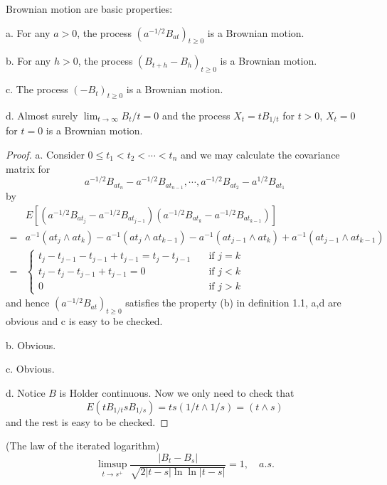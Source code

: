 \documentclass[lang=en, color=blue, ]{elegantbook}
\begin{document}
\begin{proposition}
    Brownian motion are basic properties:\par
    a. For any $a>0$, the process $(a^{-1/2}B_{at})_{t\geq 0}$ is a Brownian motion.\par
    b. For any $h>0$, the process $(B_{t+h}-B_h)_{t\geq 0}$ is a Brownian motion.\par
    c. The process $(-B_t)_{t\geq 0}$ is a Brownian motion.\par
    d. Almost surely $\lim_{t\to\infty} B_t/t = 0$ and the process $X_t = tB_{1/t}$ for $t>0$, $X_t = 0$ for $t=0$ is a Brownian motion.
\end{proposition}
\begin{proof}\par
    a. Consider $0\leq t_1<t_2<\cdots<t_n$ and we may calculate the covariance matrix for
    \[a^{-1/2}B_{at_n}-a^{-1/2}B_{at_{n-1}},\cdots,a^{-1/2}B_{at_2}-a^{1/2}B_{at_1}\]
    by
    \[
    \begin{aligned}
    &E[(a^{-1/2}B_{at_j}-a^{-1/2}B_{at_{j-1}})(a^{-1/2}B_{at_k}-a^{-1/2}B_{at_{k-1}})]\\ = &a^{-1}(at_j\wedge at_k)-a^{-1}(at_j\wedge at_{k-1})-a^{-1}(at_{j-1}\wedge at_k) + a^{-1}(at_{j-1}\wedge at_{k-1}) \\
    = &\begin{cases}
        t_j-t_{j-1}-t_{j-1}+t_{j-1} = t_j - t_{j-1}\quad&\text{if }j=k \\
        t_j-t_j - t_{j-1}+t_{j-1} = 0 &\text{if }j<k \\
        0&\text{if }j>k
    \end{cases}
    \end{aligned}
    \]
    and hence $(a^{-1/2}B_{at})_{t\geq 0}$ satisfies the property (b) in definition 1.1, a,d are obvious and c is easy to be checked.\par
    b. Obvious.\par
    c. Obvious.\par
    d. Notice $B$ is Holder continuous. Now we only need to check that
    \[
    E(tB_{1/t}sB_{1/s}) = ts(1/t\wedge 1/s) = (t\wedge s)
    \]
    and the rest is easy to be checked.
\end{proof}

\begin{theorem}
    (The law of the iterated logarithm)
    \[\limsup_{t\to s^+} \dfrac{|B_t-B_s|}{\sqrt{2|t-s|\ln\ln|t-s|}} = 1,\quad a.s.\]
\end{theorem}
\end{document}
